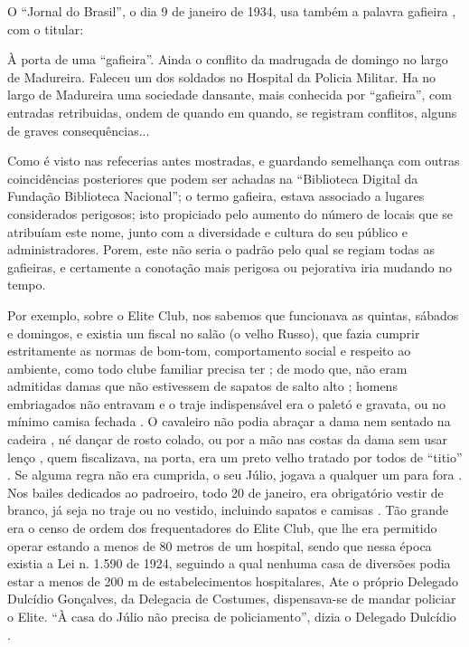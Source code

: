O ``Jornal do Brasil'', o dia 9 de janeiro de 1934, 
usa também a palavra gafieira \cite[pp. 11]{gafieirajournalbrasil1}, com o titular:
\begin{citando}%
À porta de uma ``gafieira''.
Ainda o conflito da madrugada de domingo no largo de Madureira.
Faleceu um dos soldados no Hospital da Policia Militar. 
Ha no largo de Madureira uma sociedade dansante, mais conhecida por ``gafieira'', 
com entradas retribuidas, ondem de quando em quando, se registram conflitos, 
alguns de graves consequências...
\end{citando} 
Como é visto nas refecerias antes mostradas, e guardando semelhança com outras coincidências
posteriores que podem ser achadas na ``Biblioteca Digital da Fundação Biblioteca Nacional''; 
o termo gafieira, estava associado a lugares considerados perigosos;
isto propiciado pelo aumento do número de locais que se atribuíam este nome, junto com 
a diversidade e cultura  do seu público e administradores.
Porem, este não seria o padrão pelo qual se regiam todas as gafieiras, 
e certamente a conotação mais perigosa ou pejorativa iria mudando no tempo. 


Por exemplo, sobre o Elite Club,  nos sabemos que funcionava as quintas, sábados e domingos,
e existia um fiscal no salão (o velho Russo)\cite[pp. 37]{gafieirajournalmanchete}, 
que fazia cumprir estritamente as normas de bom-tom, comportamento social e respeito ao ambiente, como todo clube familiar precisa ter \cite[pp. 12]{respeitojournalbrasil1}; de modo que, 
não eram admitidas damas que não estivessem de sapatos de salto alto \cite[pp. 37]{gafieirajournalmanchete};
homens embriagados não entravam e o traje indispensável era o paletó e gravata, 
ou no mínimo camisa fechada \cite[pp. 6 - cad. B]{entrevistajuliojournalbrasil1}.
O cavaleiro não podia abraçar a dama nem sentado na cadeira \cite[pp. 6 - cad. B]{entrevistajuliojournalbrasil1},
né dançar de rosto colado, ou por a mão nas costas da dama sem usar lenço \cite[pp. 10]{simoesjournalbrasil1}, 
quem fiscalizava, na porta, era um preto velho tratado por todos de ``titio''  \cite[pp. 37]{gafieirajournalmanchete}.
Se alguma regra não era cumprida, o seu Júlio, jogava a qualquer um para fora \cite[pp. 6 - cad. B]{entrevistajuliojournalbrasil1}.
Nos bailes dedicados ao padroeiro, todo 20 de janeiro, era obrigatório vestir de branco,
já seja no traje ou no vestido, incluindo sapatos e camisas \cite[pp. 37]{gafieirajournalmanchete}.
Tão grande era o censo de ordem dos frequentadores do Elite Club, 
que lhe era permitido operar estando a menos de 80 metros de um hospital,
sendo que nessa época existia a Lei n. 1.590 de 1924, 
seguindo a qual nenhuma casa de diversões podia estar a menos de 200 m de estabelecimentos hospitalares,
Ate o próprio Delegado Dulcídio Gonçalves, da Delegacia de Costumes,
dispensava-se de mandar policiar o Elite.
``À casa do Júlio não precisa de policiamento'', dizia o Delegado Dulcídio
\cite[pp. 5]{simoesjournalalutademocratica1}.


